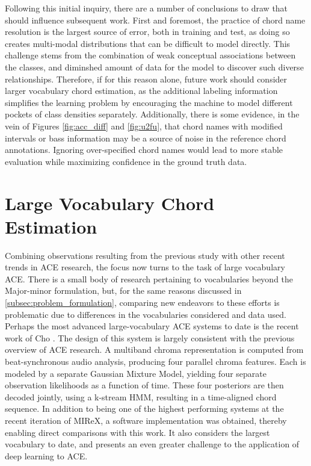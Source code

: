Following this initial inquiry, there are a number of conclusions to draw that should influence subsequent work.
First and foremost, the practice of chord name resolution is the largest source of error, both in training and test, as doing so creates multi-modal distributions that can be difficult to model directly.
This challenge stems from the combination of weak conceptual associations between the classes, and diminshed amount of data for the model to discover such diverse relationships.
Therefore, if for this reason alone, future work should consider larger vocabulary chord estimation, as the additional labeling information simplifies the learning problem by encouraging the machine to model different pockets of class densities separately.
Additionally, there is some evidence, in the vein of Figures \ref{fig:acc_diff} and \ref{fig:u2fu}, that chord names with modified intervals or bass information may be a source of noise in the reference chord annotations.
Ignoring over-specified chord names would lead to more stable evaluation while maximizing confidence in the ground truth data.



\section{Large Vocabulary Chord Estimation}
\label{subsec:large_vocabulary_ace}

Combining observations resulting from the previous study with other recent trends in ACE research, the focus now turns to the task of large vocabulary ACE.
There is a small body of research pertaining to vocabularies beyond the Major-minor formulation, but, for the same reasons discussed in \ref{subsec:problem_formulation}, comparing new endeavors to these efforts is problematic due to differences in the vocabularies considered and data used.
Perhaps the most advanced large-vocabulary ACE systems to date is the recent work of Cho \cite{Cho2014}.
The design of this system is largely consistent with the previous overview of ACE research.
A multiband chroma representation is computed from beat-synchronous audio analysis, producing four parallel chroma features.
Each is modeled by a separate Gaussian Mixture Model, yielding four separate observation likelihoods as a function of time.
These four posteriors are then decoded jointly, using a k-stream HMM, resulting in a time-aligned chord sequence.
In addition to being one of the highest performing systems at the recent iteration of MIReX, a software implementation was obtained, thereby enabling direct comparisons with this work.
It also considers the largest vocabulary to date, and presents an even greater challenge to the application of deep learning to ACE.


